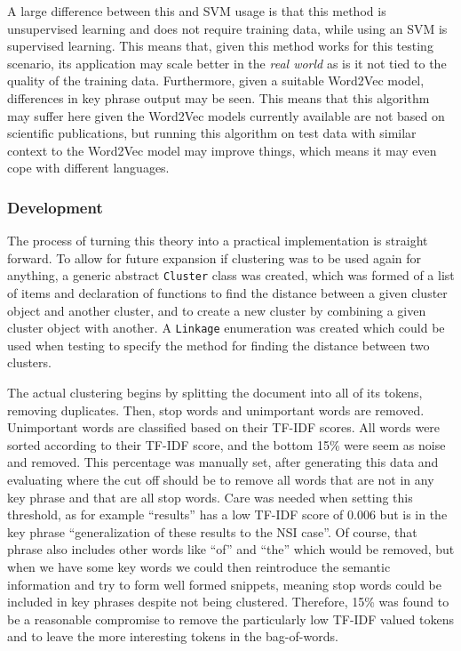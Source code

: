 A large difference between this and SVM usage is that this method is unsupervised learning and does not require training data, while using an SVM is supervised learning. This means that, given this method works for this testing scenario, its application may scale better in the \textit{real world} as is it not tied to the quality of the training data. Furthermore, given a suitable Word2Vec model, differences in key phrase output may be seen. This means that this algorithm may suffer here given the Word2Vec models currently available are not based on scientific publications, but running this algorithm on test data with similar context to the Word2Vec model may improve things, which means it may even cope with different languages.

\subsubsection*{Development}
The process of turning this theory into a practical implementation is straight forward. To allow for future expansion if clustering was to be used again for anything, a generic abstract \texttt{Cluster} class was created, which was formed of a list of items and declaration of functions to find the distance between a given cluster object and another cluster, and to create a new cluster by combining a given cluster object with another. A \texttt{Linkage} enumeration was created which could be used when testing to specify the method for finding the distance between two clusters.

The actual clustering begins by splitting the document into all of its tokens, removing duplicates. Then, stop words and unimportant words are removed. Unimportant words are classified based on their TF-IDF scores. All words were sorted according to their TF-IDF score, and the bottom 15\% were seem as noise and removed. This percentage was manually set, after generating this data and evaluating where the cut off should be to remove all words that are not in any key phrase and that are all stop words. Care was needed when setting this threshold, as for example ``results'' has a low TF-IDF score of 0.006 but is in the key phrase ``generalization of these results to the NSI case''. Of course, that phrase also includes other words like ``of'' and ``the'' which would be removed, but when we have some key words we could then reintroduce the semantic information and try to form well formed snippets, meaning stop words could be included in key phrases despite not being clustered. Therefore, 15\% was found to be a reasonable compromise to remove the particularly low TF-IDF valued tokens and to leave the more interesting tokens in the bag-of-words.


